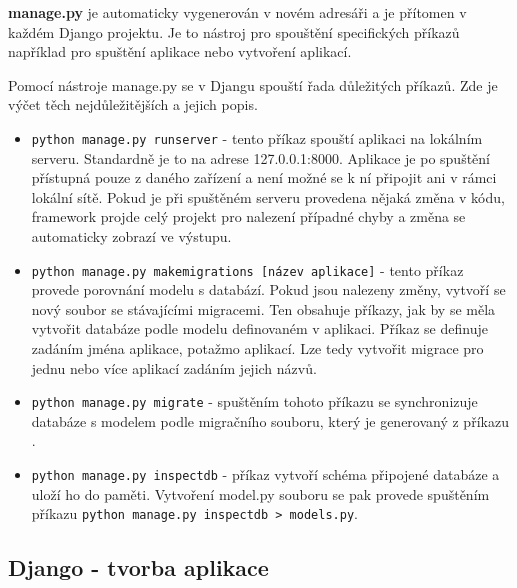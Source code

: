 \textbf{manage.py} je automaticky vygenerován v novém adresáři a je
přítomen v každém Django projektu. Je to nástroj pro spouštění
specifických příkazů například pro spuštění aplikace nebo vytvoření
aplikací.

\newpage

Pomocí nástroje manage.py se v Djangu spouští řada důležitých
příkazů. Zde je výčet těch nejdůležitějších a jejich popis. \cite{django-admin-manage}

\begin{itemize}
\item {\tt python manage.py runserver} \label{runserver}- tento příkaz spouští
  aplikaci na lokálním serveru. Standardně je to na adrese
  127.0.0.1:8000. Aplikace je po spuštění přístupná pouze z daného
  zařízení a není možné se k ní připojit ani v rámci lokální
  sítě. Pokud je při spuštěném serveru provedena nějaká změna v kódu,
  framework projde celý projekt pro nalezení případné chyby a změna se
  automaticky zobrazí ve výstupu.
	
\item {\tt python manage.py makemigrations [název aplikace]} -
  tento příkaz provede porovnání modelu s databází. Pokud jsou
  nalezeny změny, vytvoří se nový soubor se stávajícími migracemi. Ten
  obsahuje  příkazy, jak by se měla vytvořit databáze podle modelu
  definovaném v aplikaci. Příkaz se definuje zadáním jména aplikace,
  potažmo aplikací. Lze tedy vytvořit migrace pro jednu nebo
  více aplikací zadáním jejich názvů.

\item {\tt python manage.py migrate} - spuštěním tohoto příkazu se
  synchronizuje databáze s modelem podle migračního souboru, který je
  generovaný z příkazu .
	
\item {\tt python manage.py inspectdb} - příkaz vytvoří schéma
  připojené databáze a uloží ho do paměti. Vytvoření model.py souboru
  se pak provede spuštěním příkazu {\tt python manage.py inspectdb
    > models.py}.

\end{itemize}

\newpage

\subsection{Django - tvorba aplikace}

